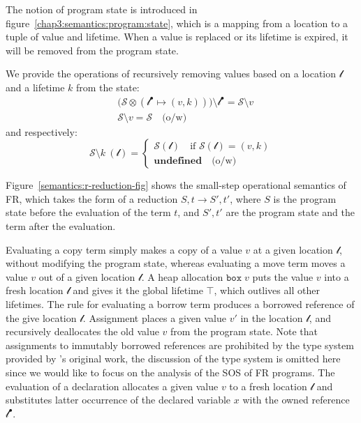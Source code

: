 The notion of program state is introduced in figure~\ref{chap3:semantics:program:state}, which is a mapping from a location to a tuple of value and lifetime. When a value is replaced or its lifetime is expired, it will be removed from the program state.

We provide the operations of recursively removing values based on a location $\mathscr{l}$ and a lifetime $k$ from the state: 
\begin{align*}
      &\bigl(\mathcal{S}\otimes(\mathscr{l}^\bullet \mapsto (v, k))\bigr)\setminus {\mathscr{l}^\bullet} = \mathcal{S}\setminus v \\
      &\mathcal{S}\setminus v = \mathcal{S} \quad\text{(o/w)}
\end{align*}
and respectively:
\[
   \mathcal{S}\setminus k \ (\mathscr{l}) =
    \begin{cases}
      \mathcal{S}(\mathscr{l}) \quad\text{if $\mathcal{S}(\mathscr{l})=(v,k)$} \\
      \textbf{undefined}\quad\text{(o/w)}
    \end{cases}
\] %

Figure~\ref{semantics:r-reduction-fig} shows the small-step operational semantics of FR, which takes the form of a reduction $S, t \longrightarrow S', t'$, where $S$ is the program state before the evaluation of the term $t$, and $S', t'$ are the program state and the term after the evaluation.

Evaluating a copy term simply makes a copy of a value $v$ at a given location $\mathscr{l}$, without modifying the program state, whereas evaluating a move term moves a value $v$ out of a given location $\mathscr{l}$.
A heap allocation $\texttt{box}\;v$ puts the value $v$ into a fresh location $\mathscr{l}$ and gives it the global lifetime $\top$, which outlives all other lifetimes. The rule for evaluating a borrow term produces a borrowed reference of the give location $\mathscr{l}$.
Assignment places a given value $v'$ in the location $\mathscr{l}$, and recursively deallocates the old value $v$ from the program state. Note that assignments to immutably borrowed references are prohibited by the type system provided by \citep{10.1145/3443420}'s original work, the discussion of the type system is omitted here since we would like to focus on the analysis of the SOS of FR programs.
The evaluation of a declaration allocates a given value $v$ to a fresh location $\mathscr{l}$ and substitutes latter occurrence of the declared variable $x$ with the owned reference $\mathscr{l}^\bullet$.

